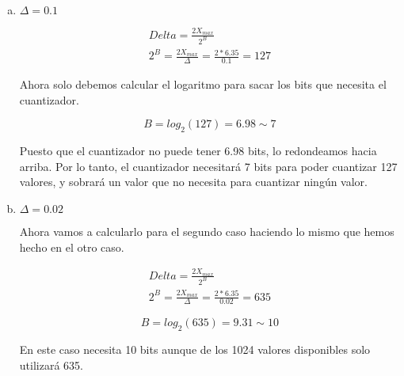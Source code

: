 \documentclass[11pt,a4paper]{article}
\begin{document}
\begin{enumerate}[a)]
	\item $\Delta = 0.1$
	
	\begin{gather*}
	Delta = \frac{2X_{max}}{2^B} \\
	2^B = \frac{2X_{max}}{\Delta} = \frac{2*6.35}{0.1} = 127
	\end{gather*}

Ahora solo debemos calcular el logaritmo para sacar los bits que necesita el cuantizador.

	\[B = log_2(127) = 6.98\sim 7\]
	
Puesto que el cuantizador no puede tener 6.98 bits, lo redondeamos hacia arriba. Por lo tanto, el cuantizador necesitará 7 bits para poder cuantizar 127 valores, y sobrará un valor que no necesita para cuantizar ningún valor.
	
	\item $\Delta = 0.02$
	
	Ahora vamos a calcularlo para el segundo caso haciendo lo mismo que hemos hecho en el otro caso.
	
	\begin{gather*}
	Delta = \frac{2X_{max}}{2^B} \\
	2^B = \frac{2X_{max}}{\Delta} = \frac{2*6.35}{0.02} = 635
	\end{gather*}

	\[B = log_2(635) = 9.31\sim 10\]
	
En este caso necesita 10 bits aunque de los 1024 valores disponibles solo utilizará 635.
\end{enumerate}

\newpage
\end{document}
